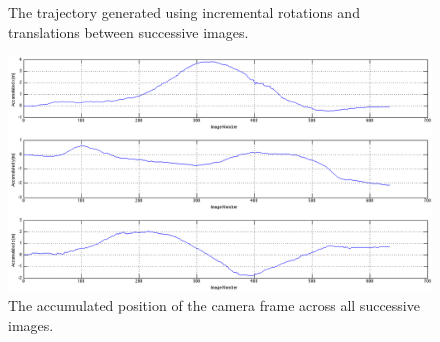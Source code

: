 \documentclass[12pt]{article} %
\begin{document}
\begin{enumerate}[label=\alph*)]
\begin{figure}[h!]
	\centering
	
	
	\caption{The trajectory generated using incremental rotations and translations between successive images.}
	\label{traj}
\end{figure}

\begin{figure}[h!]
	\centering
	\includegraphics[width=450px]{position_adjusted.png}
	\caption{The accumulated position of the camera frame across all successive images.}
	\label{pos}
\end{figure}


\end{enumerate}
\end{document}
